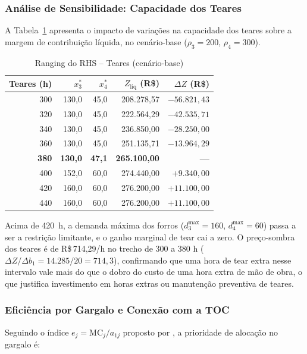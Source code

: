 \subsubsection{Análise de Sensibilidade: Capacidade dos Teares}

A Tabela~\ref{tab:rang_tear} apresenta o impacto de variações na capacidade dos
teares sobre a margem de contribuição líquida, no cenário-base ($\rho_3 = 200$,
$\rho_4 = 300$).

\begin{table}[H]
\centering
\caption{Ranging do RHS -- Teares (cenário-base)}
\label{tab:rang_tear}
\begin{tabular}{rrrrr}
\toprule
\textbf{Teares (h)} & \textbf{$x_3^*$} & \textbf{$x_4^*$} & \textbf{$Z_{\text{liq}}$ (R\$)} & \textbf{$\Delta Z$ (R\$)} \\
\midrule
300 & 130,0 & 45,0 & 208.278,57 &  $-56.821,43$ \\
320 & 130,0 & 45,0 & 222.564,29 &  $-42.535,71$ \\
340 & 130,0 & 45,0 & 236.850,00 &  $-28.250,00$ \\
360 & 130,0 & 45,0 & 251.135,71 &  $-13.964,29$ \\
\textbf{380} & \textbf{130,0} & \textbf{47,1} & \textbf{265.100,00} & \textbf{---} \\
400 & 152,0 & 60,0 & 274.440,00 &   $+9.340,00$ \\
420 & 160,0 & 60,0 & 276.200,00 &  $+11.100,00$ \\
440 & 160,0 & 60,0 & 276.200,00 &  $+11.100,00$ \\
\bottomrule
\end{tabular}
\end{table}

Acima de 420~h, a demanda máxima dos forros ($d_3^{\max} = 160$, $d_4^{\max} = 60$)
passa a ser a restrição limitante, e o ganho marginal de tear cai a zero. O
preço-sombra dos teares é de R\$\,714,29/h no trecho de 300 a 380 h
($\Delta Z / \Delta b_1 = 14.285/20 = 714{,}3$), confirmando que uma hora de
tear extra nesse intervalo vale mais do que o dobro do custo de uma hora extra
de mão de obra, o que justifica investimento em horas extras ou manutenção
preventiva de teares.

\subsubsection{Eficiência por Gargalo e Conexão com a TOC}

Seguindo o índice $e_j = \mathrm{MC}_j / a_{1j}$ proposto por \textcite{sobreiro2013},
a prioridade de alocação no gargalo é:

